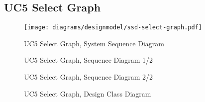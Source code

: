 \subsection{UC5 Select Graph}
\begin{figure}[H]
    \centering
    \texttt{[image: diagrams/designmodel/ssd-select-graph.pdf]}
    \caption{UC5 Select Graph, System Sequence Diagram}
    \label{fig:select-graph-ssd}
\end{figure}
\begin{figure}[p]%
  \begin{leftfullpage}
    \caption{UC5 Select Graph, Sequence Diagram 1/2}
    \label{fig:select-graph-sd-1}
  \end{leftfullpage}
\end{figure}
\begin{figure}[p]%
  \begin{fullpage}
    \caption{UC5 Select Graph, Sequence Diagram 2/2}
    \label{fig:select-graph-sd-2}
  \end{fullpage}
\end{figure}
\begin{figure}[H]
    \centering
    \caption{UC5 Select Graph, Design Class Diagram}
    \label{fig:select-graph-dcd}
\end{figure}
\newpage
% 
